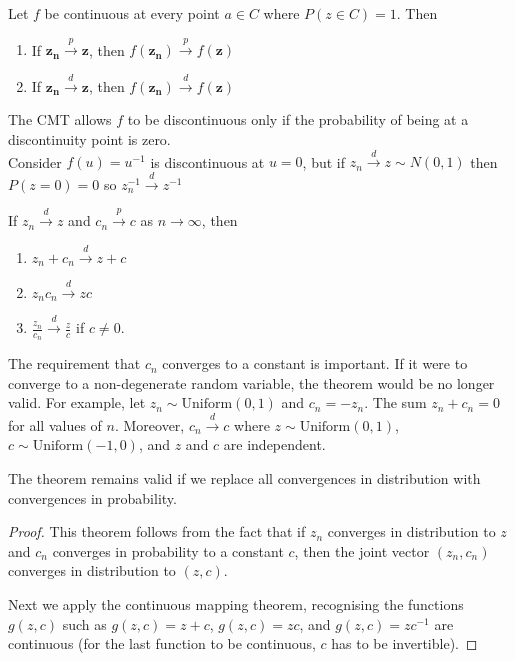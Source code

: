 \documentclass[DIV=14,titlepage=false]{scrreprt}
\begin{document}
\begin{definition}
    Let $f$ be continuous at every point $a \in C$ where $P (z \in C) = 1$. Then
    \begin{enumerate}
        \item If $\mathbf{z_n} \overset{p}{\to} \mathbf{z}$, then $f (\mathbf{z_n}) \overset{p}{\to} f(\mathbf{z})$ 
        \item If $\mathbf{z_n} \overset{d}{\to} \mathbf{z}$, then $f (\mathbf{z_n}) \overset{d}{\to} f(\mathbf{z})$ 
    \end{enumerate}

\end{definition}

\begin{example}
    The CMT allows $f$ to be discontinuous only if the probability of being at a discontinuity point is zero.\\
     Consider $f(u)=u^{-1}$ is discontinuous at $u=0$, but if $z_n \overset{d}{\to} z \sim N(0,1)$ then $P (z =0) = 0$ so $z_n^{-1} \overset{d}{\to} z^{-1}$
\end{example}

\begin{corollary}
    If \( z_n \overset{d}{\to} z \) and \( c_n \overset{p}{\to} c \) as \( n \to \infty \), then
\begin{enumerate}
    \item \( z_n + c_n \overset{d}{\to} z + c \)
    \item \( z_n c_n \overset{d}{\to} zc \)
    \item \( \frac{z_n}{c_n} \overset{d}{\to} \frac{z}{c} \) if \( c \neq 0 \).
\end{enumerate}
\end{corollary}
The requirement that \( c_n \) converges to a constant is important. If it were to converge to a non-degenerate random variable, the theorem would be no longer valid. For example, let \( z_n \sim \text{Uniform}(0,1) \) and \( c_n = -z_n \). The sum \( z_n + c_n = 0 \) for all values of \( n \). Moreover, \( c_n \overset{d}{\to} c \) where \( z \sim \text{Uniform}(0,1) \), \( c \sim \text{Uniform}(-1,0) \), and \( z \) and \( c \) are independent.

\begin{note}
    The theorem remains valid if we replace all convergences in distribution with convergences in probability.
\end{note}

\begin{proof}
This theorem follows from the fact that if \( z_n \) converges in distribution to \( z \) and \( c_n \) converges in probability to a constant \( c \), then the joint vector \( (z_n, c_n) \) converges in distribution to \( (z, c) \).

Next we apply the continuous mapping theorem, recognising the functions \( g(z,c) \) such as \( g(z,c) = z + c \), \( g(z,c) = zc \), and \( g(z,c) = z c^{-1} \) are continuous (for the last function to be continuous, \( c \) has to be invertible).
\end{proof}
\end{document}
